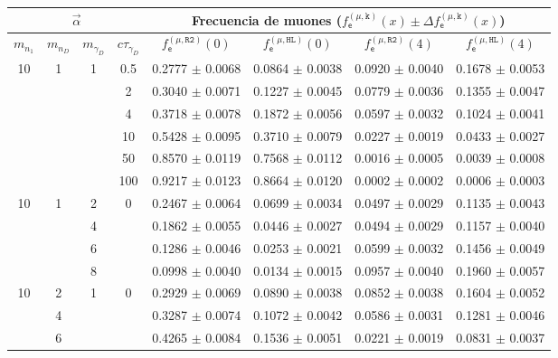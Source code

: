 \begin{table}[!t]
\footnotesize
\begin{tabular}{|cccccccc|}
\hline
\multicolumn{4}{|c|}{$\vec{\alpha}$} & \multicolumn{4}{|c|}{Frecuencia de muones ($f^{(\mu, \texttt{k})}_\textsf{e} (x) \pm \Delta f^{(\mu, \texttt{k})}_\textsf{e} (x)$)} \\
\hline
$m_{n_1}$ & $m_{n_D}$ & $m_{\gamma_D}$ & $c\tau_{\gamma_D}$ & 
$f^{(\mu, \texttt{R2})}_\textsf{e} (0)$ & 
$f^{(\mu, \texttt{HL})}_\textsf{e} (0)$ & 
$f^{(\mu, \texttt{R2})}_\textsf{e} (4)$ & 
$f^{(\mu, \texttt{HL})}_\textsf{e} (4)$ \\
\hline
10 & 1 & 1 & 0.5 & 0.2777 $\pm$ 0.0068 & 0.0864 $\pm$ 0.0038 & 0.0920 $\pm$ 0.0040 & 0.1678 $\pm$ 0.0053\\
& & & 2 & 0.3040 $\pm$ 0.0071 & 0.1227 $\pm$ 0.0045 & 0.0779 $\pm$ 0.0036 & 0.1355 $\pm$ 0.0047 \\
& & & 4 & 0.3718 $\pm$ 0.0078 & 0.1872 $\pm$ 0.0056 & 0.0597 $\pm$ 0.0032 & 0.1024 $\pm$ 0.0041\\
& & & 10 & 0.5428 $\pm$ 0.0095 & 0.3710 $\pm$ 0.0079 & 0.0227 $\pm$ 0.0019 & 0.0433 $\pm$ 0.0027\\
& & & 50 & 0.8570 $\pm$ 0.0119 & 0.7568 $\pm$ 0.0112 & 0.0016 $\pm$ 0.0005 & 0.0039 $\pm$ 0.0008\\
& & & 100 & 0.9217 $\pm$ 0.0123 & 0.8664 $\pm$ 0.0120 & 0.0002 $\pm$ 0.0002 & 0.0006 $\pm$ 0.0003\\
\hline
10 & 1 & 2 & 0 & 0.2467 $\pm$ 0.0064 & 0.0699 $\pm$ 0.0034 & 0.0497 $\pm$ 0.0029 & 0.1135 $\pm$ 0.0043 \\
& & 4 & & 0.1862 $\pm$ 0.0055 & 0.0446 $\pm$ 0.0027 & 0.0494 $\pm$ 0.0029 & 0.1157 $\pm$ 0.0040 \\
& & 6 & & 0.1286 $\pm$ 0.0046 & 0.0253 $\pm$ 0.0021 & 0.0599 $\pm$ 0.0032 & 0.1456 $\pm$ 0.0049\\
& & 8 & & 0.0998 $\pm$ 0.0040 & 0.0134 $\pm$ 0.0015 & 0.0957 $\pm$ 0.0040 & 0.1960 $\pm$ 0.0057\\
\hline
10 & 2 & 1 & 0 & 0.2929 $\pm$ 0.0069 & 0.0890 $\pm$ 0.0038 & 0.0852 $\pm$ 0.0038 & 0.1604 $\pm$ 0.0052\\
& 4 & & & 0.3287 $\pm$ 0.0074 & 0.1072 $\pm$ 0.0042 & 0.0586 $\pm$ 0.0031 & 0.1281 $\pm$ 0.0046 \\
& 6 & & & 0.4265 $\pm$ 0.0084 & 0.1536 $\pm$ 0.0051 & 0.0221 $\pm$ 0.0019 & 0.0831 $\pm$ 0.0037\\

\end{tabular}
\end{table}
